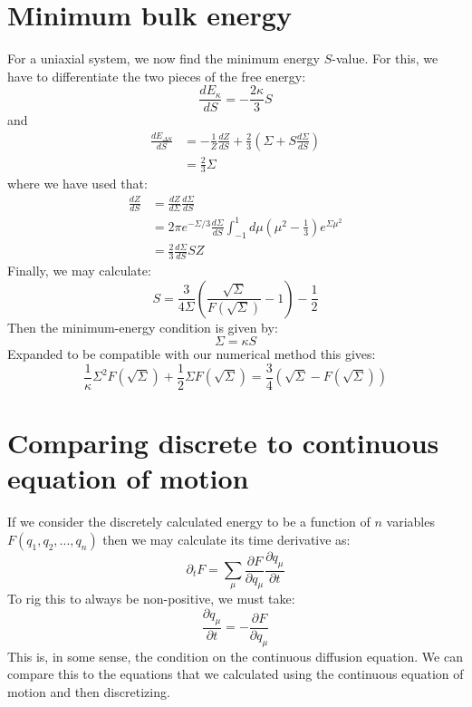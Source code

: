 \documentclass[reqno]{article}
\newcommand{\F}{F \left( \sqrt{\Sigma} \right)}
\newcommand{\sSigma}{\sqrt{\Sigma}}
\begin{document}
\section{Minimum bulk energy}

For a uniaxial system, we now find the minimum energy $S$-value.
For this, we have to differentiate the two pieces of the free energy:
\begin{equation}
    \frac{d E_\kappa}{d S}
    =
    -\frac{2 \kappa}{3} S
\end{equation}
and
\begin{equation}
\begin{split}
    \frac{d E_{\Delta S}}{d S}
    &=
    -\frac{1}{Z} \frac{d Z}{d S}
    + \frac23 \left( \Sigma + S \frac{d \Sigma}{d S} \right) \\
    &=
    \frac23 \Sigma
\end{split}
\end{equation}
where we have used that:
\begin{equation}
\begin{split}
    \frac{d Z}{d S}
    &=
    \frac{d Z}{d \Sigma} \frac{d \Sigma}{d S} \\
    &=
    2 \pi e^{-\Sigma / 3} \frac{d \Sigma}{d S} \int_{-1}^1 d\mu \left( \mu^2 - \tfrac13 \right) e^{\Sigma \mu^2}\\
    &=
    \frac23 \frac{d \Sigma}{dS} S Z
\end{split}
\end{equation}
Finally, we may calculate:
\begin{equation}
    S
    =
    \frac{3}{4 \Sigma} \left( \frac{\sqrt{\Sigma}}{F\left(\sqrt{\Sigma}\right)} - 1 \right) - \frac12
\end{equation}
Then the minimum-energy condition is given by:
\begin{equation}
    \Sigma
    =
    \kappa S
\end{equation}
Expanded to be compatible with our numerical method this gives:
\begin{equation}
    \frac{1}{\kappa} \Sigma^2 \F + \frac12 \Sigma \F
    =
    \frac34 \left( \sSigma - \F \right)
\end{equation}

\section{Comparing discrete to continuous equation of motion}

If we consider the discretely calculated energy to be a function of $n$ variables $F(q_1, q_2, ..., q_n)$ then we may calculate its time derivative as:
\begin{equation}
    \partial_t F
    =
    \sum_\mu \frac{\partial F}{\partial q_\mu} \frac{\partial q_\mu}{\partial t}
\end{equation}
To rig this to always be non-positive, we must take:
\begin{equation}
    \frac{\partial q_\mu}{\partial t}
    =
    -\frac{\partial F}{\partial q_\mu}
\end{equation}
This is, in some sense, the condition on the continuous diffusion equation.
We can compare this to the equations that we calculated using the continuous equation of motion and then discretizing.
\end{document}
